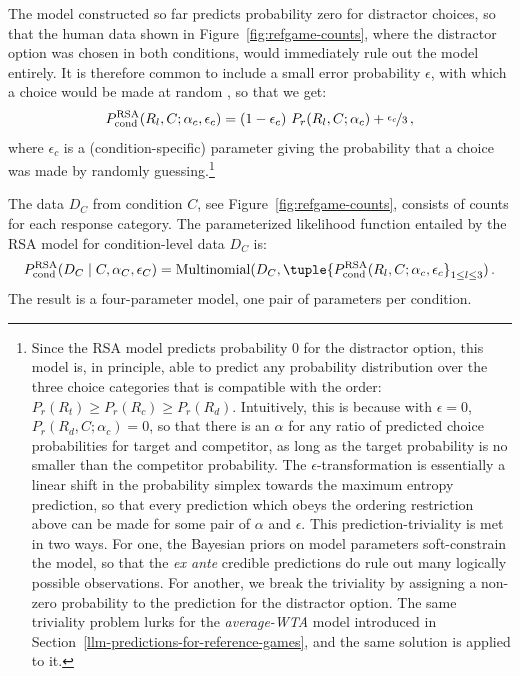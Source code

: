 \documentclass[fleqn]{article}
\begin{document}
The model constructed so far predicts probability zero for distractor choices, so that the human data shown in Figure~\ref{fig:refgame-counts}, where the distractor option was chosen in both conditions, would immediately rule out the model entirely.
It is therefore common to include a small error probability $\epsilon$, with which a choice would be made at random \citep[e.g.,][]{LeeWagenmakers2013:Bayesian-Cognit}, so that we get:
%
\begin{align*}
  P_{\text{cond}}^{\text{RSA}}(R_{l}, C; \alpha_{c}, \epsilon_{c}) = (1 - \epsilon_{c}) \  P_{r}(R_{l}, C; \alpha_{c}) +  \nicefrac{\epsilon_{c}}{3}\,,
\end{align*}
%
where $\epsilon_{c}$ is a (condition-specific) parameter giving the probability that a choice was made by randomly guessing.\footnote{
  Since the RSA model predicts probability 0 for the distractor option, this model is, in principle, able to predict any probability distribution over the three choice categories that is compatible with the order: $P_{r}(R_{t}) \ge P_{r}(R_{c}) \ge P_{r}(R_{d})$.
  Intuitively, this is because with $\epsilon=0$, $P_{r}(R_{d}, C; \alpha_{c}) = 0$, so that there is an $\alpha$ for any ratio of predicted choice probabilities for target and competitor, as long as the target probability is no smaller than the competitor probability.
  The $\epsilon$-transformation is essentially a linear shift in the probability simplex towards the maximum entropy prediction, so that every prediction which obeys the ordering restriction above can be made for some pair of $\alpha$ and $\epsilon$.
  This prediction-triviality is met in two ways.
  For one, the Bayesian priors on model parameters soft-constrain the model, so that the \emph{ex ante} credible predictions do rule out many logically possible observations.
  For another, we break the triviality by assigning a non-zero probability to the prediction for the distractor option.
  The same triviality problem lurks for the \emph{average-WTA} model introduced in Section~\ref{llm-predictions-for-reference-games}, and the same solution is applied to it.
}

The data $D_{C}$ from condition $C$, see Figure~\ref{fig:refgame-counts}, consists of counts for each response category.
The parameterized likelihood function entailed by the RSA model for condition-level data $D_{C}$ is:
%
\begin{align}
  \label{eq:RSA-likelihood}
 P^{\text{RSA}}_{\text{cond}}(D_{C} \mid C, \alpha_{C}, \epsilon_{C}) = \text{Multinomial}(D_{C}, \tuple{P_{\text{cond}}^{\text{RSA}}(R_{l}, C; \alpha_{c}, \epsilon_{c}}_{1 \le l \le 3})\,.
\end{align}
%
The result is a four-parameter model, one pair of parameters per condition.
\end{document}
